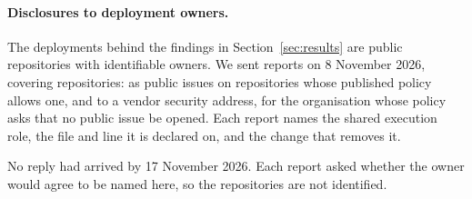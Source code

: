 \paragraph{Disclosures to deployment owners.}
The deployments behind the findings in Section~\ref{sec:results} are public
repositories with identifiable owners. We sent \nDisclosureReports reports on 8 November 2026,
covering \nDisclosureRepos repositories: \nDisclosureIssues
as public issues on repositories whose published policy allows one, and
\nDisclosureEmails to a vendor security address, for the organisation whose
policy asks that no public issue be opened. Each report names the shared
execution role, the file and line it is declared on, and the change that
removes it.

No reply had arrived by 17 November 2026. Each report asked whether the owner
would agree to be named here, so the repositories are not identified.
